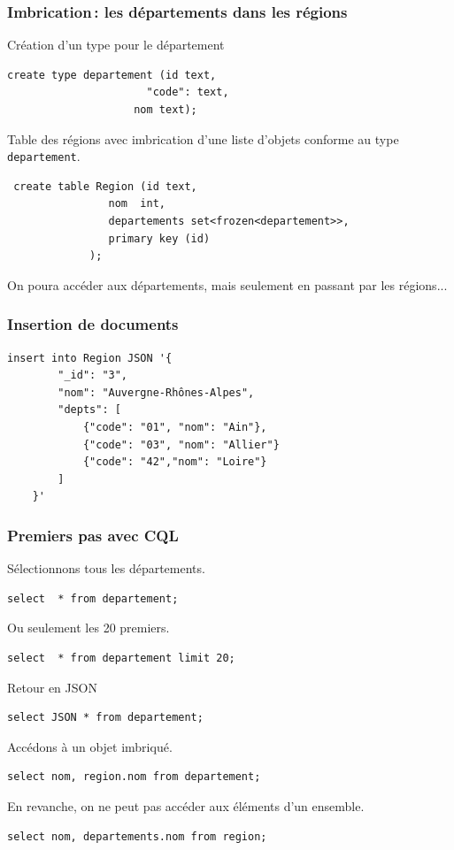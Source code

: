 \begin{frame}[fragile]
\frametitle{Imbrication\,: les départements dans les régions}

Création d'un type pour le département
\begin{verbatim}
create type departement (id text,
                      "code": text,
                    nom text);
\end{verbatim}

\vfill

Table des régions avec imbrication \alert{d'une liste} d'objets conforme au type \texttt{departement}.


\begin{verbatim}
 create table Region (id text, 
                nom  int, 
                departements set<frozen<departement>>,
                primary key (id) 
             );
\end{verbatim}

\vfill

On poura accéder aux départements, mais seulement en passant par les régions...
\end{frame}

\begin{frame}[fragile]
\frametitle{Insertion de documents}

\begin{verbatim}
insert into Region JSON '{
		"_id": "3",
		"nom": "Auvergne-Rhônes-Alpes",
		"depts": [
			{"code": "01", "nom": "Ain"},
			{"code": "03", "nom": "Allier"}
			{"code": "42","nom": "Loire"}
		]
	}' 
\end{verbatim}

\end{frame}



\begin{frame}[fragile] \frametitle{Premiers pas avec CQL}

Sélectionnons tous les départements.

\begin{verbatim}
select  * from departement;
\end{verbatim}

\vfill

Ou seulement les 20 premiers.
\begin{verbatim}
select  * from departement limit 20;
\end{verbatim}

\vfill
Retour en JSON
\begin{verbatim}
select JSON * from departement;
\end{verbatim}

\vfill
Accédons à un objet imbriqué.
\begin{verbatim}
select nom, region.nom from departement;
\end{verbatim}

\vfill
En revanche, on ne peut pas accéder aux éléments d'un ensemble.
\begin{verbatim}
select nom, departements.nom from region;
\end{verbatim}
\end{frame}

